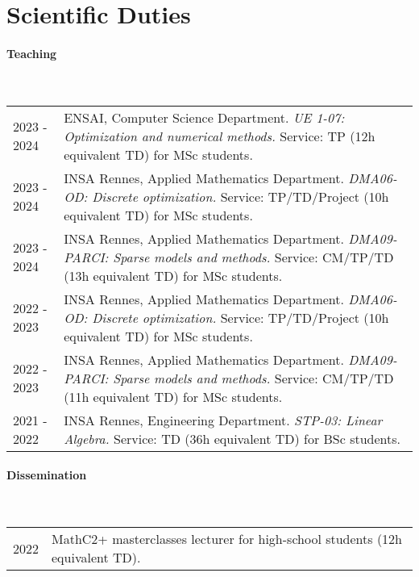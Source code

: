 \section{Scientific Duties}

\paragraph{Teaching}~\\

\begin{longtable}[l]{@{}p{}p{}}
    2023 - 2024 & ENSAI, Computer Science Department. \textit{UE 1-07: Optimization and numerical methods.} Service: TP (12h equivalent TD) for MSc students. \\
    2023 - 2024 & INSA Rennes, Applied Mathematics Department. \textit{DMA06-OD: Discrete optimization.} Service: TP/TD/Project (10h equivalent TD) for MSc students. \\
    2023 - 2024 & INSA Rennes, Applied Mathematics Department. \textit{DMA09-PARCI: Sparse models and methods.} Service: CM/TP/TD (13h equivalent TD) for MSc students. \\
    2022 - 2023 & INSA Rennes, Applied Mathematics Department. \textit{DMA06-OD: Discrete optimization.} Service: TP/TD/Project (10h equivalent TD) for MSc students. \\
    2022 - 2023 & INSA Rennes, Applied Mathematics Department. \textit{DMA09-PARCI: Sparse models and methods.} Service: CM/TP/TD (11h equivalent TD) for MSc students. \\
    2021 - 2022 & INSA Rennes, Engineering Department. \textit{STP-03: Linear Algebra.} Service: TD (36h equivalent TD) for BSc students. \\
\end{longtable}


\paragraph{Dissemination}~\\

\begin{longtable}[l]{@{}p{} p{}}
    2022 & MathC2+ masterclasses lecturer for high-school students (12h equivalent TD).
\end{longtable}